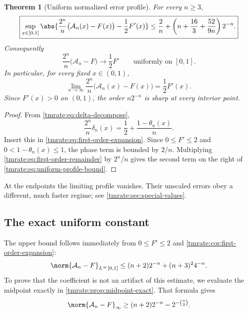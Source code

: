 \documentclass[11pt,oneside]{article}
\newtheorem{theorem}{Theorem}[section]
\theoremstyle{definition}
\theoremstyle{remark}
\begin{document}
\begin{theorem}[Uniform normalized error profile]
\label{tmrate:thm:pointwise-rate}
For every $n\ge3$,
\begin{equation}
 \boxed{\displaystyle
 \sup_{x\in[0,1]}
 \abs{\frac{2^n}{n}\bigl(\mathcal A_n(x)-F(x)\bigr)
       -\frac12F'(x)}
 \le \frac2n+
 \left(n+\frac{16}{3}+\frac{52}{9n}\right)2^{-n}.}          \label{tmrate:eq:uniform-profile-bound}
\end{equation}
Consequently
\begin{equation}
 \frac{2^n}{n}\bigl(\mathcal A_n-F\bigr)
 \longrightarrow\frac12F'
 \qquad\text{uniformly on }[0,1].                           \label{tmrate:eq:uniform-profile-limit}
\end{equation}
In particular, for every fixed $x\in(0,1)$,
\begin{equation}
 \lim_{n\to\infty}
 \frac{2^n}{n}\bigl(\mathcal A_n(x)-F(x)\bigr)
 =\frac12F'(x).                                             \label{tmrate:eq:pointwise-rate}
\end{equation}
Since $F'(x)>0$ on $(0,1)$, the order $n2^{-n}$ is sharp at every interior
point.
\end{theorem}

\begin{proof}
From \eqref{tmrate:eq:delta-decompose},
\begin{equation*}
 \frac{2^n}{n}\delta_n(x)
 =\frac12+\frac{1-\theta_n(x)}{n}.
\end{equation*}
Insert this in \eqref{tmrate:eq:first-order-expansion}.  Since $0\le F'\le2$ and
$0<1-\theta_n(x)\le1$, the phase term is bounded by $2/n$.  Multiplying
\eqref{tmrate:eq:first-order-remainder} by $2^n/n$ gives the second term on the
right of \eqref{tmrate:eq:uniform-profile-bound}.
\end{proof}

At the endpoints the limiting profile vanishes.  Their unscaled errors obey a
different, much faster regime; see \cref{tmrate:sec:special-values}.

\subsection{The exact uniform constant}

The upper bound follows immediately from $0\le F'\le2$ and
\cref{tmrate:cor:first-order-expansion}:
\begin{equation}
 \norm{\mathcal A_n-F}_{L^\infty[0,1]}
 \le (n+2)2^{-n}+(n+3)^2 4^{-n}.                           \label{tmrate:eq:uniform-upper}
\end{equation}
To prove that the coefficient is not an artifact of this estimate, we evaluate
the midpoint exactly in \cref{tmrate:prop:midpoint-exact}.  That formula gives
\begin{equation}
 \norm{\mathcal A_n-F}_{\infty}
 \ge (n+2)2^{-n}-2^{-\binom n2}.                           \label{tmrate:eq:uniform-lower}
\end{equation}
\end{document}
